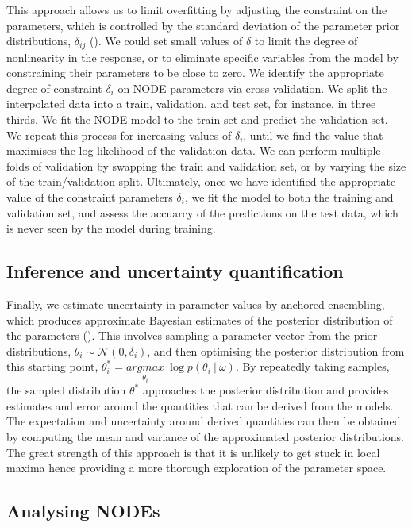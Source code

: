 \documentclass[11pt, oneside]{article}
\begin{document}
This approach allows us to limit overfitting by adjusting the constraint on the parameters, which is controlled by the standard deviation of the parameter prior distributions, $\delta_{ij}$ (\cite{Cawley2007, Bonnaffe2021a}).
We could set small values of $\delta$ to limit the degree of nonlinearity in the response, or to eliminate specific variables from the model by constraining their parameters to be close to zero.
We identify the appropriate degree of constraint $\delta_{i}$ on NODE parameters via cross-validation. 
We split the interpolated data into a train, validation, and test set, for instance, in three thirds.
We fit the NODE model to the train set and predict the validation set.
We repeat this process for increasing values of $\delta_{i}$, until we find the value that maximises the log likelihood of the validation data.
We can perform multiple folds of validation by swapping the train and validation set, or by varying the size of the train/validation split.
Ultimately, once we have identified the appropriate value of the constraint parameters $\delta_{i}$, we fit the model to both the training and validation set, and assess the accuarcy of the predictions on the test data, which is never seen by the model during training.

\subsection{Inference and uncertainty quantification}

Finally, we estimate uncertainty in parameter values by anchored ensembling, which produces approximate Bayesian estimates of the posterior distribution of the parameters (\cite{Pearce2018}).
This involves sampling a parameter vector from the prior distributions, $\theta_{i} \sim \mathcal{N}(0,\delta_{i})$, and then optimising the posterior distribution from this starting point, $\theta^*_i = \underset{\theta_i}{argmax}~\log p(\theta_i~|~\omega)$.
By repeatedly taking samples, the sampled distribution $\theta^*$ approaches the posterior distribution and provides estimates and error around the quantities that can be derived from the models.
The expectation and uncertainty around derived quantities can then be obtained by computing the mean and variance of the approximated posterior distributions.
The great strength of this approach is that it is unlikely to get stuck in local maxima hence providing a more thorough exploration of the parameter space.

\subsection{Analysing NODEs}
\end{document}
